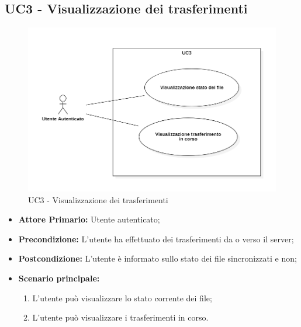 \subsection{UC3 - Visualizzazione dei trasferimenti}
\begin{figure}[H]
    \centering
    \includegraphics[scale = 0.7]{components/img/UC3.png}
    \caption{UC3 - Visualizzazione dei trasferimenti}
\end{figure}
\begin{itemize}
\item \textbf{Attore Primario:} Utente autenticato;
\item \textbf{Precondizione:} L'utente ha effettuato dei trasferimenti da o verso il server;
\item \textbf{Postcondizione:} L'utente è informato sullo stato dei file sincronizzati e non;
\item \textbf{Scenario principale:}
    \begin{enumerate}
    \item L'utente può visualizzare lo stato corrente dei file;
    \item L'utente può visualizzare i trasferimenti in corso.
    \end{enumerate}
\end{itemize}